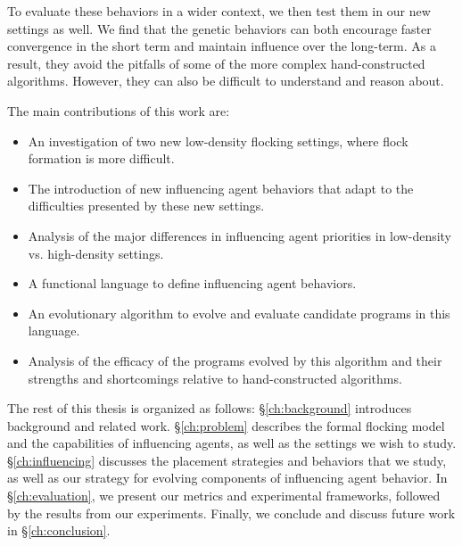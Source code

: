 To evaluate these behaviors in a wider context, we then test them in our new
settings as well.
We find that the genetic behaviors can both encourage faster convergence in the
short term and maintain influence over the long-term.
As a result, they avoid the pitfalls of some of the more complex
hand-constructed algorithms.
However, they can also be difficult to understand and reason about.

The main contributions of this work are:
\begin{itemize}
    \item An investigation of two new low-density flocking settings, where
    flock formation is more difficult.
    \item The introduction of new influencing agent behaviors that adapt to the
    difficulties presented by these new settings.
    \item Analysis of the major differences in influencing agent priorities in
    low-density vs. high-density settings.
    \item A functional language to define influencing agent behaviors.
    \item An evolutionary algorithm to evolve and evaluate candidate programs
    in this language.
    \item Analysis of the efficacy of the programs evolved by this algorithm
    and their strengths and shortcomings relative to hand-constructed
    algorithms.
\end{itemize}

The rest of this thesis is organized as follows: \S\ref{ch:background}
introduces background and related work.
\S\ref{ch:problem} describes the formal flocking model and the capabilities of
influencing agents, as well as the settings we wish to study.
\S\ref{ch:influencing} discusses the placement strategies and behaviors that we
study, as well as our strategy for evolving components of influencing agent
behavior.
In \S\ref{ch:evaluation}, we present our metrics and experimental frameworks,
followed by the results from our experiments.
Finally, we conclude and discuss future work in \S\ref{ch:conclusion}.

